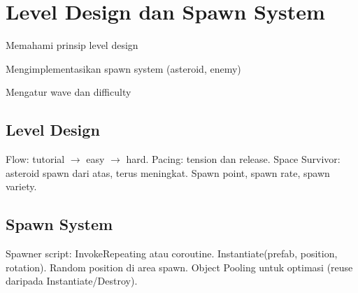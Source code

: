 \section{Level Design dan Spawn System}

\begin{learningoutcomes}
\item Memahami prinsip level design
\item Mengimplementasikan spawn system (asteroid, enemy)
\item Mengatur wave dan difficulty
\end{learningoutcomes}

\subsection{Level Design}

Flow: tutorial $\rightarrow$ easy $\rightarrow$ hard. Pacing: tension dan release. Space Survivor: asteroid spawn dari atas, terus meningkat. Spawn point, spawn rate, spawn variety.

\subsection{Spawn System}

Spawner script: InvokeRepeating atau coroutine. Instantiate(prefab, position, rotation). Random position di area spawn. Object Pooling untuk optimasi (reuse daripada Instantiate/Destroy).
